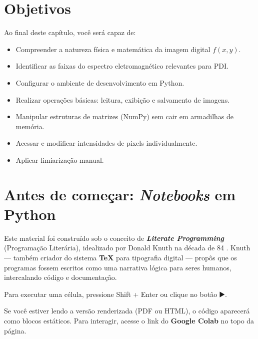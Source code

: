 \documentclass[
  portuguese,
  letterpaper,
  openany,
  oneside,
  12pt,
  a4paper]{book}
\providecommand{\tightlist}{%
  \setlength{\itemsep}{0pt}\setlength{\parskip}{0pt}}
\begin{document}
\section{Objetivos}\label{objetivos}

Ao final deste capítulo, você será capaz de:

\begin{itemize}
\tightlist
\item
  Compreender a natureza física e matemática da imagem digital
  \(f(x,y)\).
\item
  Identificar as faixas do espectro eletromagnético relevantes para PDI.
\item
  Configurar o ambiente de desenvolvimento em Python.
\item
  Realizar operações básicas: leitura, exibição e salvamento de imagens.
\item
  Manipular estruturas de matrizes (NumPy) sem cair em armadilhas de
  memória.
\item
  Acessar e modificar intensidades de pixels individualmente.
\item
  Aplicar limiarização manual.
\end{itemize}

\section{\texorpdfstring{Antes de começar: \emph{Notebooks} em
Python}{Antes de começar: Notebooks em Python}}\label{antes-de-comeuxe7ar-notebooks-em-python-1}

Este material foi construído sob o conceito de \textbf{\emph{Literate
Programming}} (Programação Literária), idealizado por Donald Knuth na
década de 84 \autocite{knuth_literate_1984}. Knuth --- também criador do
sistema \textbf{TeX} para tipografia digital --- propôs que os programas
fossem escritos como uma narrativa lógica para seres humanos,
intercalando código e documentação.

Para executar uma célula, pressione Shift + Enter ou clique no botão ▶️.

\begin{tcolorbox}[enhanced jigsaw, colframe=quarto-callout-note-color-frame, opacitybacktitle=0.6, coltitle=black, rightrule=.15mm, bottomrule=.15mm, arc=.35mm, toprule=.15mm, breakable, opacityback=0, colbacktitle=quarto-callout-note-color!10!white, left=2mm, title=\textcolor{quarto-callout-note-color}{\faInfo}\hspace{0.5em}{Nota sobre o formato}, bottomtitle=1mm, toptitle=1mm, titlerule=0mm, leftrule=.75mm, colback=white]

Se você estiver lendo a versão renderizada (PDF ou HTML), o código
aparecerá como blocos estáticos. Para interagir, acesse o link do
\textbf{Google Colab} no topo da página.

\end{tcolorbox}
\end{document}
